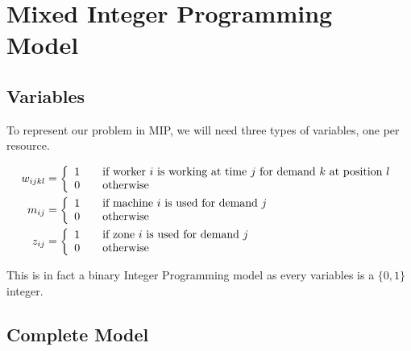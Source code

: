 \documentclass[../thesis.tex]{subfiles}
\begin{document}
\section{Mixed Integer Programming Model}

\subsection{Variables}

To represent our problem in MIP, we will need three types of variables, one per resource.



\begin{equation*}
\begin{split}
    w_{ijkl} &=  \left \{
                   \begin{array}{l l}
                      1 \quad & \textrm{if worker $i$ is working at time $j$ for demand $k$ at position $l$} \\
                      0 \quad & \textrm{otherwise} 
                   \end{array}
                   \right . \\
   m_{ij} &=  \left \{
                   \begin{array}{l l}
                      1 \quad & \textrm{if machine $i$ is used for demand $j$} \\
                      0 \quad & \textrm{otherwise} 
                   \end{array}
                   \right . \\
    z_{ij} &= \left \{
               \begin{array}{l l}
                  1 \quad & \textrm{if zone $i$ is used for demand $j$} \\
                  0 \quad & \textrm{otherwise} 
               \end{array}
               \right . \\
\end{split}
\end{equation*}

This is in fact a binary Integer Programming model as every variables is a $\{0, 1\}$ integer. 

\subsection{Complete Model}
\end{document}
